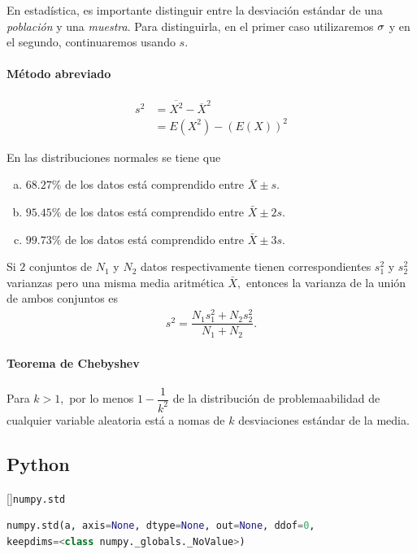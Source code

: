  \begin{rem}
  En estadística, es importante distinguir entre la desviación estándar de una \emph{población} y una \emph{muestra}. Para distinguirla, en el primer caso utilizaremos $\sigma$ y en el segundo, continuaremos usando $s.$
 \end{rem}


\paragraph{Método abreviado}
 \begin{align}
  s^{2}&=\overline{X^{2}}-\overline{X}^{2} \\
  &= E(X^2)-\left( E(X) \right)^{2}
 \end{align}



En las distribuciones normales se tiene que
\begin{enumerate}[(a)]
 \item $68.27\%$ de los datos está comprendido entre $\bar{X}\pm s.$
 \item $95.45\%$ de los datos está comprendido entre $\bar{X}\pm 2s.$
 \item $99.73\%$ de los datos está comprendido entre $\bar{X}\pm 3s.$

\end{enumerate}



 Si $2$ conjuntos de $N_{1}$ y $N_{2}$ datos respectivamente tienen correspondientes $s_{1}^{2}$ y $s_{2}^{2}$ varianzas pero una misma media aritmética $\bar{X},$ entonces la varianza de la unión de ambos conjuntos es
 \begin{align}
s^{2}=\dfrac{N_{1}s_{1}^{2}+N_{2}s_{2}^{2}}{N_{1}+N_{2}}.
\end{align}

\paragraph{Teorema de Chebyshev}
Para $k>1,$ por lo menos $1-\dfrac{1}{k^{2}}$ de la distribución de problemaabilidad de cualquier variable aleatoria está a nomas  de $k$ desviaciones estándar de la media.

\subsection{Python}
[]{\texttt{numpy.std}}
\begin{lstlisting}[language=Python]
numpy.std(a, axis=None, dtype=None, out=None, ddof=0,
keepdims=<class numpy._globals._NoValue>)
\end{lstlisting}


